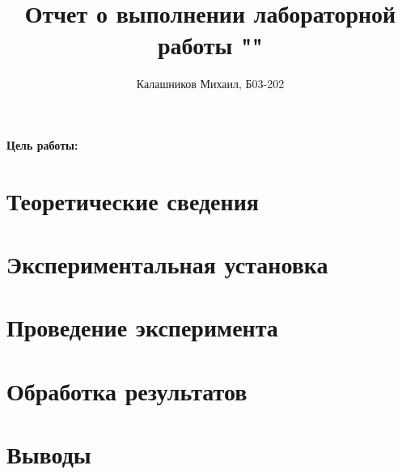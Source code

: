 \documentclass[14pt, a4paper]{report}
\title{\textbf{Отчет о выполнении лабораторной работы ""}}
\author{Калашников Михаил, Б03-202}
\date{}
\begin{document}
\maketitle


\textbf{Цель работы:}
\newline

\section{Теоретические сведения}

\begin{figure}[H]
\centering
\caption{}
\end{figure}

\section{Экспериментальная установка}

\section{Проведение эксперимента}

\section{Обработка результатов}

\section{Выводы}
\end{document}

